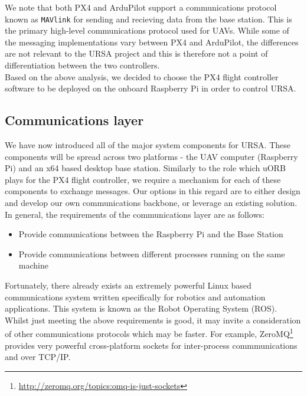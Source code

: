 \documentclass[capstone_report.tex]{subfiles}
\begin{document}
We note that both PX4 and ArduPilot support a communications protocol known as \texttt{MAVlink} for sending and recieving data from the base station. This is the primary high-level communications protocol used for UAVs. While some of the messaging implementations vary between PX4 and ArduPilot, the differences are not relevant to the URSA project and this is therefore not a point of differentiation between the two controllers. \\

Based on the above analysis, we decided to choose the PX4 flight controller software to be deployed on the onboard Raspberry Pi in order to control URSA.

\subsection{Communications layer}\label{subsec:comm_layer}
We have now introduced all of the major system components for URSA. These components will be spread across two platforms - the UAV computer (Raspberry Pi) and an x64 based desktop base station. Similarly to the role which uORB plays for the PX4 flight controller, we require a mechanism for each of these components to exchange messages. Our options in this regard are to either design and develop our own communications backbone, or leverage an existing solution. In general, the requirements of the communications layer are as follows:

\begin{itemize}
	\item Provide communications between the Raspberry Pi and the Base Station
	\item Provide communications between different processes running on the same machine 
\end{itemize}

Fortunately, there already exists an extremely powerful Linux based communications system written specifically for robotics and automation applications. This system is known as the Robot Operating System (ROS). Whilst just meeting the above requirements is good, it may invite a consideration of other communications protocols which may be faster. For example, ZeroMQ\footnote{\url{http://zeromq.org/topics:omq-is-just-sockets}} provides very powerful cross-platform sockets for inter-process commmunications and over TCP/IP. \\
\end{document}
